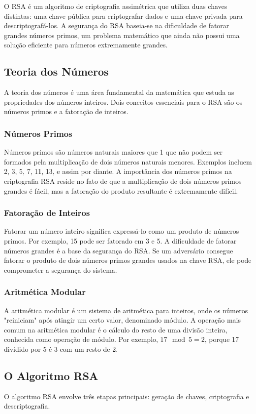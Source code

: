 \documentclass[a4paper,12pt]{article}
\begin{document}
O RSA é um algoritmo de criptografia assimétrica que utiliza duas chaves distintas: uma chave pública para criptografar dados e uma chave privada para descriptografá-los. A segurança do RSA baseia-se na dificuldade de fatorar grandes números primos, um problema matemático que ainda não possui uma solução eficiente para números extremamente grandes.

\subsection*{Teoria dos Números}
A teoria dos números é uma área fundamental da matemática que estuda as propriedades dos números inteiros. Dois conceitos essenciais para o RSA são os números primos e a fatoração de inteiros.

\subsubsection*{Números Primos}
Números primos são números naturais maiores que 1 que não podem ser formados pela multiplicação de dois números naturais menores. Exemplos incluem 2, 3, 5, 7, 11, 13, e assim por diante. A importância dos números primos na criptografia RSA reside no fato de que a multiplicação de dois números primos grandes é fácil, mas a fatoração do produto resultante é extremamente difícil.

\subsubsection*{Fatoração de Inteiros}
Fatorar um número inteiro significa expressá-lo como um produto de números primos. Por exemplo, 15 pode ser fatorado em 3 e 5. A dificuldade de fatorar números grandes é a base da segurança do RSA. Se um adversário consegue fatorar o produto de dois números primos grandes usados na chave RSA, ele pode comprometer a segurança do sistema.

\subsubsection*{Aritmética Modular}
A aritmética modular é um sistema de aritmética para inteiros, onde os números "reiniciam" após atingir um certo valor, denominado módulo. A operação mais comum na aritmética modular é o cálculo do resto de uma divisão inteira, conhecida como operação de módulo. Por exemplo, \( 17 \mod 5 = 2 \), porque 17 dividido por 5 é 3 com um resto de 2.

\subsection*{O Algoritmo RSA}
O algoritmo RSA envolve três etapas principais: geração de chaves, criptografia e descriptografia.
\end{document}
